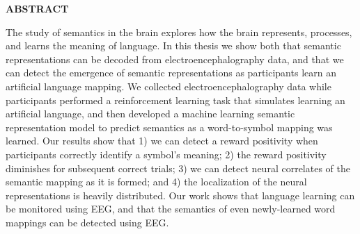 \newpage
{}

\begin{center}
\textbf{ABSTRACT}
\end{center}

The study of semantics in the brain explores how the brain represents, 
processes, and learns the meaning of language. In this thesis we show both that 
semantic representations can be decoded from electroencephalography data, and 
that we can detect the emergence of semantic representations as participants 
learn an artificial language mapping. We collected electroencephalography data 
while participants performed a reinforcement learning task that simulates 
learning an artificial language, and then developed a machine learning semantic 
representation model to predict semantics as a word-to-symbol mapping was 
learned. Our results show that 1) we can detect a reward positivity when 
participants correctly identify a symbol's meaning; 2) the reward positivity 
diminishes for subsequent correct trials; 3) we can detect neural correlates of 
the semantic mapping as it is formed; and 4) the localization of the neural 
representations is heavily distributed. Our work shows that language learning 
can be monitored using EEG, and that the semantics of even newly-learned word 
mappings can be detected using EEG.
